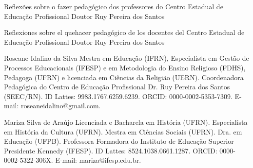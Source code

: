 \begin{refsection}
    \renewcommand{\thefigure}{\arabic{figure}}
    
    \chapterOneLine
    {Reflexões sobre o fazer pedagógico dos professores do Centro Estadual de Educação Profissional Doutor Ruy Pereira dos Santos}
    \label{chap:reflexao-fazer-pedagogico}

    \begin{otherlanguage}{english}

        \fakeChapterOneLine
        {Reflexiones sobre el quehacer pedagógico de los docentes del Centro Estadual de Educação Profissional Doutor Ruy Pereira dos Santos}
    
    \end{otherlanguage}

    \articleAuthor
    {Roseane Idalino da Silva}
    {Mestra em Educação (IFRN), Especialista em Gestão de Processos Educacionais (IFESP) e em Metodologia do Ensino Religioso (FDHS), Pedagoga (UFRN) e licenciada em Ciências da Religião (UERN). Coordenadora Pedagógica do Centro de Educação Profissional Dr. Ruy Pereira dos Santos (SEEC/RN). ID Lattes: 9983.1767.6259.6239. ORCID: 0000-0002-5353-7309. E-mail: roseaneidalino@gmail.com.}
    
    \articleAuthor
    {Mariza Silva de Araújo}
    {Licenciada e Bacharela em História (UFRN). Especialista em História da Cultura (UFRN). Mestra em Ciências Sociais (UFRN). Dra. em Educação (UFPB). Professora Formadora do Instituto de Educação Superior Presidente Kennedy (IFESP). ID Lattes: 8524.1038.0661.1287. ORCID: 0000-0002-5322-306X. E-mail: mariza@ifesp.edu.br.}
    

\end{refsection}
